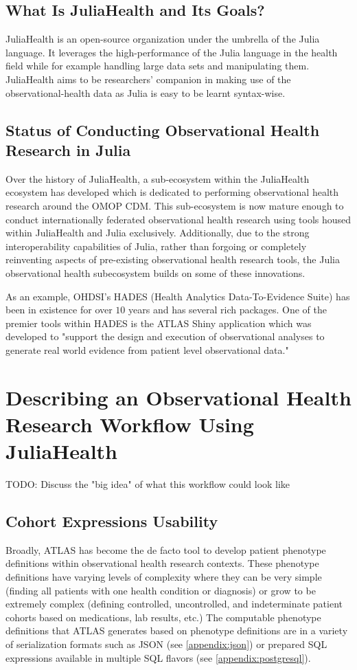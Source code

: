 \documentclass{juliacon}
\begin{document}
\subsection{What Is JuliaHealth and Its Goals?}
JuliaHealth is an open-source organization under the umbrella of the Julia language. It leverages the high-performance of the Julia language in the health field while for example handling large data sets and manipulating them. JuliaHealth aims to be researchers' companion in making use of the observational-health data as Julia is easy to be learnt syntax-wise.

\subsection{Status of Conducting Observational Health Research in Julia}

Over the history of JuliaHealth, a sub-ecosystem within the JuliaHealth ecosystem has developed which is dedicated to performing observational health research around the OMOP CDM.
This sub-ecosystem is now mature enough to conduct internationally federated observational health research using tools housed within JuliaHealth and Julia exclusively.
Additionally, due to the strong interoperability capabilities of Julia, rather than forgoing or completely reinventing aspects of pre-existing observational health research tools, the Julia observational health subecosystem builds on some of these innovations.

As an example, OHDSI's HADES (Health Analytics Data-To-Evidence Suite) has been in existence for over $10$ years and has several rich packages.
One of the premier tools within HADES is the ATLAS Shiny application which was developed to "support the design and execution of observational analyses to generate real world evidence from patient level observational data."

\section{Describing an Observational Health Research Workflow Using JuliaHealth}

TODO: Discuss the "big idea" of what this workflow could look like

\subsection{Cohort Expressions Usability}

Broadly, ATLAS has become the de facto tool to develop patient phenotype definitions within observational health research contexts.
These phenotype definitions have varying levels of complexity where they can be very simple (finding all patients with one health condition or diagnosis) or grow to be extremely complex (defining controlled, uncontrolled, and indeterminate patient cohorts based on medications, lab results, etc.)
The computable phenotype definitions that ATLAS generates based on phenotype definitions are in a variety of serialization formats such as JSON (see \ref{appendix:json}) or prepared SQL expressions available in multiple SQL flavors (see \ref{appendix:postgresql}).
\end{document}
